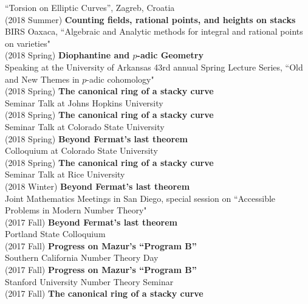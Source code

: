 \documentclass[margin,line]{res}
\begin{document}
\begin{resume}
``Torsion on Elliptic Curves'', Zagreb, Croatia
\vspace{.05cm}\\
(2018 Summer) \textbf{Counting fields, rational points, and heights on stacks}\\
BIRS Oaxaca, ``Algebraic and Analytic methods for integral and rational points on varieties"
\vspace{.05cm}\\
(2018 Spring) \textbf{Diophantine and $p$-adic Geometry}\\
Speaking at the University of Arkansas 43rd annual Spring Lecture Series, ``Old and New Themes in $p$-adic cohomology"
\vspace{.05cm}\\
(2018 Spring) \textbf{The canonical ring of a stacky curve}\\  
Seminar Talk at Johns Hopkins University
\\
(2018 Spring) \textbf{The canonical ring of a stacky curve}\\  
Seminar Talk at Colorado State University
\\
(2018 Spring) \textbf{Beyond Fermat's last theorem}\\
Colloquium at Colorado State University 
\vspace{.05cm}\\
(2018 Spring) \textbf{The canonical ring of a stacky curve}\\  
Seminar Talk at Rice University
\vspace{.05cm}\\
(2018 Winter) \textbf{Beyond Fermat's last theorem}\\
Joint Mathematics Meetings in San Diego, special session on ``Accessible Problems in Modern Number Theory" 
\vspace{.05cm}\\
(2017 Fall) \textbf{Beyond Fermat's last theorem}\\
Portland State Colloquium
\vspace{.05cm}\\
(2017 Fall) \textbf{Progress on Mazur's ``Program B''}\\  
Southern California Number Theory Day
\vspace{.05cm}\\
(2017 Fall) \textbf{Progress on Mazur's ``Program B''}\\  
Stanford University Number Theory Seminar
\vspace{.05cm}\\
(2017 Fall) \textbf{The canonical ring of a stacky curve}\\  

\end{resume}
\end{document}
